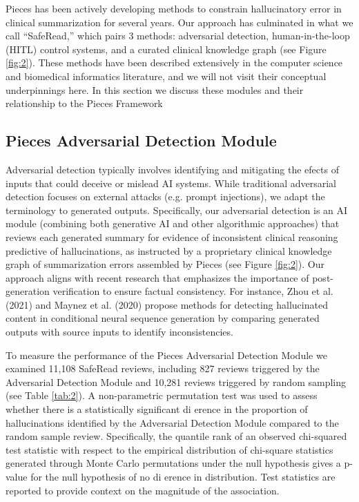 \documentclass{style/myclass}
\begin{document}
Pieces has been actively developing methods to constrain hallucinatory error in clinical summarization for several years. Our approach has culminated in what we call “SafeRead,” which pairs 3 methods: adversarial detection, human-in-the-loop (HITL) control systems, and a curated clinical knowledge graph (see Figure \ref{fig:2}). These methods have been described extensively in the computer science and biomedical informatics literature, and we will not visit their conceptual underpinnings here. In this section we discuss these modules and their relationship to the Pieces Framework

\subsection{Pieces Adversarial Detection Module}

Adversarial detection typically involves identifying and mitigating the efects of inputs that could deceive or mislead AI systems. \cite{8} While traditional adversarial detection focuses on external attacks (e.g. prompt injections), we adapt the terminology to generated outputs. Specifically, our adversarial detection is an AI module (combining both generative AI and other algorithmic approaches) that reviews each generated summary for evidence of inconsistent clinical reasoning predictive of hallucinations, as instructed by a proprietary clinical knowledge graph of summarization errors assembled by Pieces (see Figure \ref{fig:2}). Our approach aligns with recent research that emphasizes the importance of post-generation verification to ensure factual consistency. For instance, Zhou et al. (2021) and Maynez et al. (2020) propose methods for detecting hallucinated content in conditional neural sequence generation by comparing generated outputs with source inputs to identify inconsistencies. \cite{5,6} 

To measure the performance of the Pieces Adversarial Detection Module we examined 11,108 SafeRead reviews, including 827 reviews triggered by the Adversarial Detection Module and 10,281 reviews triggered by random sampling (see Table \ref{tab:2}). A non-parametric permutation test was used to assess whether there is a statistically significant di erence in the proportion of hallucinations identified by the Adversarial Detection Module compared to the random sample review. \cite{9} Specifically, the quantile rank of an observed chi-squared test statistic with respect to the empirical distribution of chi-square statistics generated through Monte Carlo permutations under the null hypothesis gives a p-value for the null hypothesis of no di erence in distribution. Test statistics are reported to provide context on the magnitude of the association.
\end{document}
